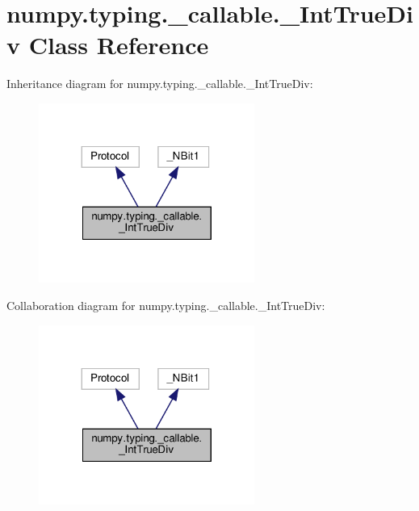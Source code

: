 \hypertarget{classnumpy_1_1typing_1_1__callable_1_1__IntTrueDiv}{}\section{numpy.\+typing.\+\_\+callable.\+\_\+\+Int\+True\+Div Class Reference}
\label{classnumpy_1_1typing_1_1__callable_1_1__IntTrueDiv}


Inheritance diagram for numpy.\+typing.\+\_\+callable.\+\_\+\+Int\+True\+Div\+:
\nopagebreak
\begin{figure}[H]
\begin{center}
\leavevmode
\includegraphics[width=200pt]{classnumpy_1_1typing_1_1__callable_1_1__IntTrueDiv__inherit__graph}
\end{center}
\end{figure}


Collaboration diagram for numpy.\+typing.\+\_\+callable.\+\_\+\+Int\+True\+Div\+:
\nopagebreak
\begin{figure}[H]
\begin{center}
\leavevmode
\includegraphics[width=200pt]{classnumpy_1_1typing_1_1__callable_1_1__IntTrueDiv__coll__graph}
\end{center}
\end{figure}
